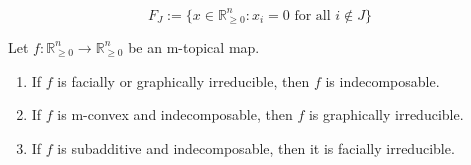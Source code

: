 \documentclass[10pt,a4paper]{amsart}
\newcommand{\R}{\mathbb{R}}
\begin{document}
\begin{equation} \label{eq:face}
F_J := \{ x \in \R^n_{\ge 0} : x_i = 0 \text{ for all } i \notin J \}
\end{equation}

\begin{theorem} \label{thm:connect1}
Let $f:\R^n_{\ge 0} \rightarrow \R^n_{\ge 0}$ be an m-topical map.  
\begin{enumerate}
\item \label{item:face=>indecomp} If $f$ is facially or graphically irreducible, then $f$ is indecomposable. 
\item \label{item:mconvex1} If $f$ is m-convex and indecomposable, then $f$ is graphically irreducible.  
\item \label{item:subadditive} If $f$ is subadditive and indecomposable, then it is facially irreducible. %
\end{enumerate}
\end{theorem}
\end{document}
